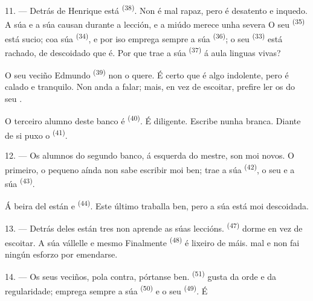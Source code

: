 \VUsaut{4.2mm}
\VUsaut{3.2mm}

11. --- Detrás de Henrique está  \textsuperscript{(38)}. Non é mal
rapaz, pero é  desatento e inquedo. A súa  e a
súa  causan  durante a lección, e a miúdo
merece unha severa  O seu 
\textsuperscript{(35)} está sucio;  coa súa 
\textsuperscript{(34)}, e por iso emprega sempre a súa 
\textsuperscript{(36)}; o seu  \textsuperscript{(33)} está rachado,
de descoidado que é. Por que trae a súa 
\textsuperscript{(37)} á aula  linguas vivas?

O seu veciño Edmundo \textsuperscript{(39)} non o quere. É certo que é algo
indolente, pero é calado e tranquilo. Non anda a falar; mais, en vez de escoitar, prefire
ler os  do seu .

O terceiro alumno deste banco é  \textsuperscript{(40)}. É
diligente. Escribe nunha  branca. Diante de si puxo o
 \textsuperscript{(41)}.

12. --- Os alumnos do segundo banco, á esquerda do mestre, son moi novos. O primeiro,
o pequeno  aínda non sabe escribir moi ben; trae a súa
 \textsuperscript{(42)}, o seu  e a súa
 \textsuperscript{(43)}.

Á beira del están  e  \textsuperscript{(44)}. Este
último traballa ben, pero a súa  está moi descoidada.

13. --- Detrás deles están tres  non aprende as súas
leccións.  \textsuperscript{(47)} dorme en vez de escoitar. A súa
 vállelle  e mesmo  Finalmente
 \textsuperscript{(48)} é lixeiro de máis.
 mal e non fai ningún esforzo por emendarse.

14. --- Os seus veciños, pola contra, pórtanse ben. 
\textsuperscript{(51)} gusta da orde e da regularidade; emprega sempre a súa
 \textsuperscript{(50)} e o seu  \textsuperscript{(49)}.
É 

